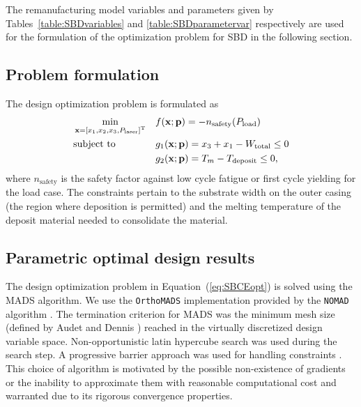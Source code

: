 The remanufacturing model variables and parameters given by Tables~\ref{table:SBDvariables} and \ref{table:SBDparametervar} respectively are used for the formulation of the optimization problem for \ac{SBD} in the following section. 

\subsection{Problem formulation} \label{subsec:SBDproblemformulation}

The design optimization problem is formulated as 
\begin{equation}
	\label{eq:SBCEopt}
	\begin{aligned}
		& \min_{\mathbf{x} = \left[x_1,x_2,x_3,P_{\textrm{laser}}\right]^{\text T}}
		& & f(\mathbf{x};\mathbf{p}) = -n_{\textrm{safety}}(P_{\textrm{load}})\\
		& \text{subject to}
		& & g_1(\mathbf{x};\mathbf{p}) = x_3 + x_1 - W_{\textrm{total}} \le 0\\
		& & & g_2(\mathbf{x};\mathbf{p}) = T_m - T_\textrm{deposit} \le 0,
	\end{aligned}
\end{equation}
where $n_{\textrm{safety}}$ is the safety factor against low cycle fatigue or first cycle yielding for the load case. The constraints pertain to the substrate width on the outer casing (the region where deposition is permitted) and the melting temperature of the deposit material needed to consolidate the material.

\subsection{Parametric optimal design results} \label{subsec:reduceddesignspace}

The design optimization problem in Equation~(\ref{eq:SBCEopt}) is solved using the \ac{MADS} algorithm. We use the \texttt{OrthoMADS} implementation provided by the \texttt{NOMAD} algorithm \cite{LeDigabel2011}. The termination criterion for \ac{MADS} was the minimum mesh size (defined by Audet and Dennis \cite{Audet2006a}) reached in the virtually discretized design variable space. Non-opportunistic latin hypercube search was used during the search step. A progressive barrier approach was used for handling constraints \cite{Audet2009}. This choice of algorithm is motivated by the possible non-existence of gradients or the inability to approximate them with reasonable computational cost and warranted due to its rigorous convergence properties.

